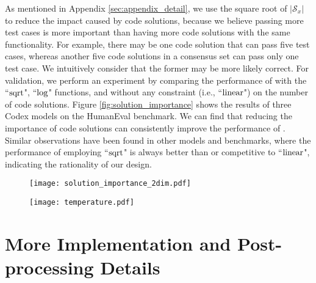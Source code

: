 As mentioned in Appendix \ref{sec:appendix_detail}, we use the square root of $|\mathcal{S}_x|$ to reduce the impact caused by code solutions, because we believe passing more test cases is more important than having more code solutions with the same functionality. For example, there may be one code solution that can pass five test cases, whereas another five code solutions in a consensus set can pass only one test case. We intuitively consider that the former may be more likely correct. 
For validation, we perform an experiment by comparing the performance of \ours with the ``$\rm{sqrt}$", ``$\rm{log}$" functions, and without any constraint (i.e., ``$\rm{linear}$") on the number of code solutions. Figure \ref{fig:solution_importance} shows the results of three Codex models on the HumanEval benchmark. We can find that reducing the importance of code solutions can consistently improve the performance of \ours. Similar observations have been found in other models and benchmarks, where the performance of employing ``$\rm{sqrt}$" is always better than or competitive to ``$\rm{linear}$", indicating the rationality of our design.




\begin{figure}
\centering
\begin{minipage}{.49\textwidth}
  \centering
  \texttt{[image: solution\_importance\_2dim.pdf]}
  \label{fig:solution_importance}
\end{minipage}
\hspace{0.1cm}
\begin{minipage}{.49\textwidth}
  \centering
  \texttt{[image: temperature.pdf]}
  \label{fig:temperature}
\end{minipage}
\end{figure}

\iffalse
\section{More Implementation and Post-processing Details}
\label{sec:appendix_details}

